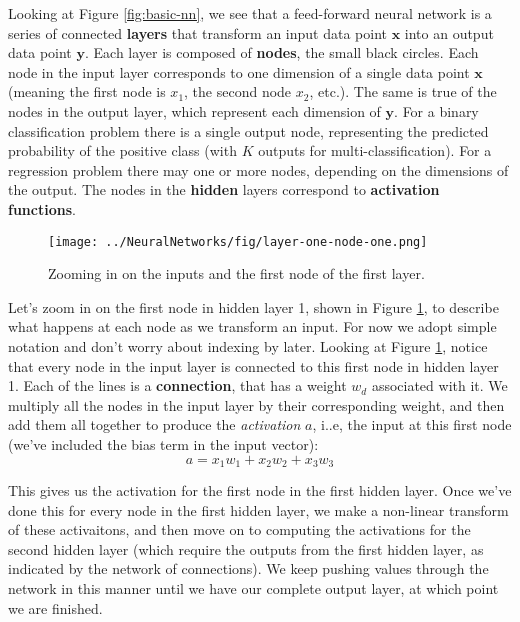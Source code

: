 Looking at Figure \ref{fig:basic-nn}, we see that a feed-forward neural network is a series of connected \textbf{layers} that transform an input data point $\textbf{x}$ into an output data point $\textbf{y}$. Each layer is composed of \textbf{nodes}, the small black circles. Each node in the input layer corresponds to one dimension of a single data point $\textbf{x}$ (meaning the first node is $x_1$, the second node $x_2$, etc.). The same is true of the nodes in the output layer, which represent each dimension of $\textbf{y}$.  For a binary classification problem there is a single output node, representing the predicted probability of the positive class (with $K$ outputs for multi-classification). For a regression problem there may one or more nodes, depending on the dimensions of the output.  The nodes in the  \textbf{hidden} layers correspond to  \textbf{activation functions}.

\begin{figure}
    \centering
    \texttt{[image: ../NeuralNetworks/fig/layer-one-node-one.png]}
    \caption{Zooming in on the inputs and the first node of the first layer.}
    \label{fig:layer-one-node-one}
\end{figure}

 Let's zoom in on the first node in hidden layer 1, shown in Figure \ref{fig:layer-one-node-one}, to describe what happens at each node as we transform an input. For now we adopt simple notation and don't worry about indexing by later.
Looking at Figure \ref{fig:layer-one-node-one}, notice that every node in the input layer is connected to this first node in hidden layer 1. Each of the lines is a \textbf{connection}, that has a weight $w_{d}$ associated with it. We multiply all the nodes in the input layer by their corresponding weight, and then add them all together to produce the {\em activation} $a$, i..e,  the input at this first node (we've included the bias term in the input vector):
\begin{equation}
	a = x_{1} w_{1} + x_{2} w_{2} + x_{3} w_{3}
\end{equation}

This gives us the activation for the first node in the first hidden layer. Once we've done this for every node in the first hidden layer, we make a non-linear transform of these activaitons, and then move on to computing the activations for the second hidden layer (which require the outputs from the first hidden layer, as indicated by the network of connections). We keep pushing values through the network in this manner until we have our complete output layer, at which point we are finished.

